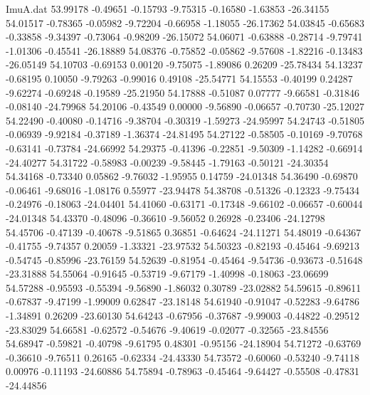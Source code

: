 \begin{filecontents}{ImuA.dat}
  53.99178   -0.49651   -0.15793   -9.75315   -0.16580   -1.63853  -26.34155
  54.01517   -0.78365   -0.05982   -9.72204   -0.66958   -1.18055  -26.17362
  54.03845   -0.65683   -0.33858   -9.34397   -0.73064   -0.98209  -26.15072
  54.06071   -0.63888   -0.28714   -9.79741   -1.01306   -0.45541  -26.18889
  54.08376   -0.75852   -0.05862   -9.57608   -1.82216   -0.13483  -26.05149
  54.10703   -0.69153    0.00120   -9.75075   -1.89086    0.26209  -25.78434
  54.13237   -0.68195    0.10050   -9.79263   -0.99016    0.49108  -25.54771
  54.15553   -0.40199    0.24287   -9.62274   -0.69248   -0.19589  -25.21950
  54.17888   -0.51087    0.07777   -9.66581   -0.31846   -0.08140  -24.79968
  54.20106   -0.43549    0.00000   -9.56890   -0.06657   -0.70730  -25.12027
  54.22490   -0.40080   -0.14716   -9.38704   -0.30319   -1.59273  -24.95997
  54.24743   -0.51805   -0.06939   -9.92184   -0.37189   -1.36374  -24.81495
  54.27122   -0.58505   -0.10169   -9.70768   -0.63141   -0.73784  -24.66992
  54.29375   -0.41396   -0.22851   -9.50309   -1.14282   -0.66914  -24.40277
  54.31722   -0.58983   -0.00239   -9.58445   -1.79163   -0.50121  -24.30354
  54.34168   -0.73340    0.05862   -9.76032   -1.95955    0.14759  -24.01348
  54.36490   -0.69870   -0.06461   -9.68016   -1.08176    0.55977  -23.94478
  54.38708   -0.51326   -0.12323   -9.75434   -0.24976   -0.18063  -24.04401
  54.41060   -0.63171   -0.17348   -9.66102   -0.06657   -0.60044  -24.01348
  54.43370   -0.48096   -0.36610   -9.56052    0.26928   -0.23406  -24.12798
  54.45706   -0.47139   -0.40678   -9.51865    0.36851   -0.64624  -24.11271
  54.48019   -0.64367   -0.41755   -9.74357    0.20059   -1.33321  -23.97532
  54.50323   -0.82193   -0.45464   -9.69213   -0.54745   -0.85996  -23.76159
  54.52639   -0.81954   -0.45464   -9.54736   -0.93673   -0.51648  -23.31888
  54.55064   -0.91645   -0.53719   -9.67179   -1.40998   -0.18063  -23.06699
  54.57288   -0.95593   -0.55394   -9.56890   -1.86032    0.30789  -23.02882
  54.59615   -0.89611   -0.67837   -9.47199   -1.99009    0.62847  -23.18148
  54.61940   -0.91047   -0.52283   -9.64786   -1.34891    0.26209  -23.60130
  54.64243   -0.67956   -0.37687   -9.99003   -0.44822   -0.29512  -23.83029
  54.66581   -0.62572   -0.54676   -9.40619   -0.02077   -0.32565  -23.84556
  54.68947   -0.59821   -0.40798   -9.61795    0.48301   -0.95156  -24.18904
  54.71272   -0.63769   -0.36610   -9.76511    0.26165   -0.62334  -24.43330
  54.73572   -0.60060   -0.53240   -9.74118    0.00976   -0.11193  -24.60886
  54.75894   -0.78963   -0.45464   -9.64427   -0.55508   -0.47831  -24.44856

\end{filecontents}

